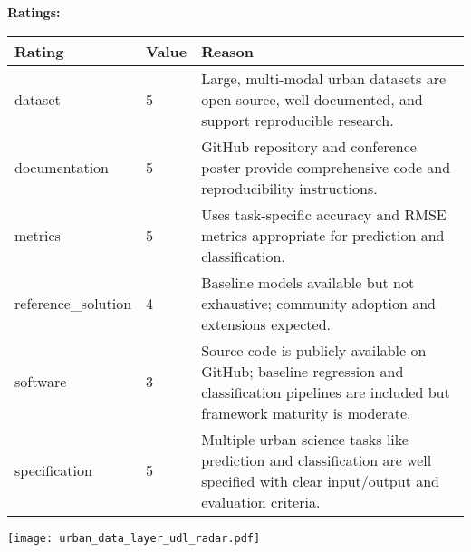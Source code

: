 {{{\bf Ratings:} ~ \\

\begin{tabular}{p{} p{} p{}}
\hline
Rating & Value & Reason \\
\hline
dataset & 5 & Large, multi-modal urban datasets are open-source, well-documented, and support
reproducible research.
 \\
documentation & 5 & GitHub repository and conference poster provide comprehensive code and reproducibility
instructions.
 \\
metrics & 5 & Uses task-specific accuracy and RMSE metrics appropriate for prediction and classification.
 \\
reference\_solution & 4 & Baseline models available but not exhaustive; community adoption and extensions expected.
 \\
software & 3 & Source code is publicly available on GitHub; baseline regression and classification
pipelines are included but framework maturity is moderate.
 \\
specification & 5 & Multiple urban science tasks like prediction and classification are well specified
with clear input/output and evaluation criteria.
 \\
\hline
\end{tabular}

\texttt{[image: urban\_data\_layer\_udl\_radar.pdf]}
}}
\clearpage